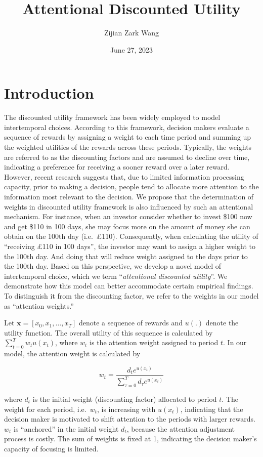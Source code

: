 \documentclass[
  12pt,
]{article}
\title{Attentional Discounted Utility}
\author{Zijian Zark Wang}
\date{June 27, 2023}
\begin{document}
\maketitle

\hypertarget{introduction}{%
\section{Introduction}\label{introduction}}

The discounted utility framework has been widely employed to model
intertemporal choices. According to this framework, decision makers
evaluate a sequence of rewards by assigning a weight to each time period
and summing up the weighted utilities of the rewards across these
periods. Typically, the weights are referred to as the discounting
factors and are assumed to decline over time, indicating a preference
for receiving a sooner reward over a later reward. However, recent
research suggests that, due to limited information processing capacity,
prior to making a decision, people tend to allocate more attention to
the information most relevant to the decision. We propose that the
determination of weights in discounted utility framework is also
influenced by such an attentional mechanism. For instance, when an
investor consider whether to invest \$100 now and get \$110 in 100 days,
she may focus more on the amount of money she can obtain on the 100th
day (i.e.~£110). Consequently, when calculating the utility of
``receiving £110 in 100 days'', the investor may want to assign a higher
weight to the 100th day. And doing that will reduce weight assigned to
the days prior to the 100th day. Based on this perspective, we develop a
novel model of intertemporal choice, which we term ``\emph{attentional
discounted utility}''. We demonstrate how this model can better
accommodate certain empirical findings. To distinguish it from the
discounting factor, we refer to the weights in our model as ``attention
weights.''

Let \(\textbf{x} = [x_0, x_1, …, x_T]\) denote a sequence of rewards and
\(u(.)\) denote the utility function. The overall utility of this
sequence is calculated by \(\sum_{t=0}^T w_t u(x_t)\), where \(w_t\) is
the attention weight assigned to period \(t\). In our model, the
attention weight is calculated by

\[
w_t = \frac{d_t e^{u(x_t)}}{\sum_{\tau=0}^T d_\tau e^{u(x_t)}}
\]

where \(d_t\) is the initial weight (discounting factor) allocated to
period \(t\). The weight for each period, i.e.~\(w_t\), is increasing
with \(u(x_t)\), indicating that the decision maker is motivated to
shift attention to the periods with larger rewards. \(w_t\) is
``anchored'' in the initial weight \(d_t\), because the attention
adjustment process is costly. The sum of weights is fixed at 1,
indicating the decision maker's capacity of focusing is limited.
\end{document}
